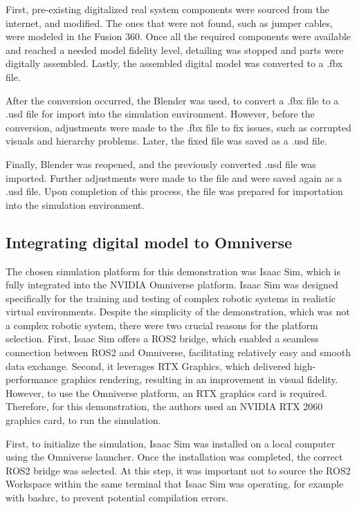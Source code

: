\documentclass[conference]{IEEEtran}
\begin{document}
    First, pre-existing digitalized real system components were sourced from the internet, and modified.
     The ones that were not found, such as jumper cables, were modeled in the Fusion 360. 
     Once all the required components were available and reached a needed model fidelity level, 
     detailing was stopped and parts were digitally assembled. Lastly, the assembled digital model 
     was converted to a .fbx file.

    After the conversion occurred, the Blender was used, to convert a .fbx file to a .usd 
    file for import into the simulation environment. However, before the conversion, adjustments 
    were made to the .fbx file to fix issues, such as corrupted visuals and hierarchy problems. 
    Later, the fixed file was saved as a .usd file. 

    Finally, Blender was reopened, and the previously converted .usd file was imported. 
    Further adjustments were made to the file and were saved again as a .usd file.
    Upon completion of this process, the file was prepared for importation into the simulation environment.

    \subsection*{Integrating digital model to Omniverse}\label{section:omniverse}
    The chosen simulation platform for this demonstration was Isaac Sim, which is fully integrated into the NVIDIA Omniverse platform. Isaac Sim was designed specifically for the training and testing of complex robotic systems in realistic virtual environments. Despite the simplicity of the demonstration, which was not a complex robotic system, there were two crucial reasons for the platform selection. First, Isaac Sim offers a ROS2 bridge, which enabled a seamless connection between ROS2 and Omniverse, facilitating relatively easy and smooth data exchange. Second, it leverages RTX Graphics, which delivered high-performance graphics rendering, resulting in an improvement in visual fidelity. However, to use the Omniverse platform, an RTX graphics card is required. Therefore, for this demonstration, the authors used an NVIDIA RTX 2060 graphics card, to run the simulation. 

    First, to initialize the simulation, Isaac Sim was installed on a local computer using the Omniverse launcher. Once the installation was completed, the correct ROS2 bridge was selected.  At this step, it was important not to source the ROS2 Workspace within the same terminal that Isaac Sim was operating, for example with bashrc, to prevent potential compilation errors. 
\end{document}
